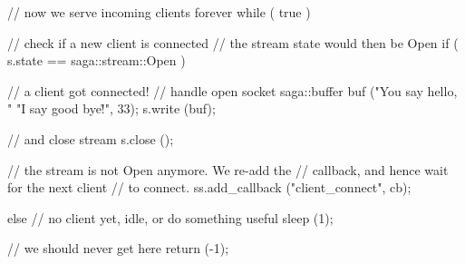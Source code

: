 \begin{mycode}
{       // now we serve incoming clients forever
       while ( true )
       {
         // check if a new client is connected
         // the stream state would then be Open
         if ( s.state == saga::stream::Open )
         {
           // a client got connected!
           // handle open socket
           saga::buffer buf ("You say hello, "
                             "I say good bye!\r\n", 33);
           s.write (buf);
 
           // and close stream
           s.close ();
 
           // the stream is not Open anymore.  We re-add the
           // callback, and hence wait for the next client
           // to connect.
           ss.add_callback ("client_connect", cb);
         }
         else
         {
           // no client yet, idle, or do something useful
           sleep (1);
         }
       }
 
       // we should never get here
       return (-1);
     }
 \end{mycode}
 
 
 
